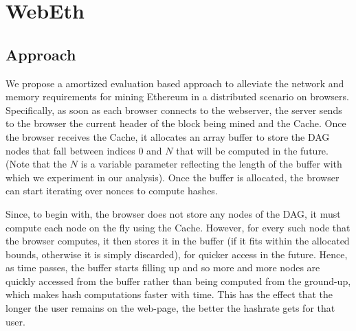 \documentclass[runningheads]{llncs}
\newcommand{\trishita}[1]{}%
\begin{document}
\section{WebEth}
\label{sec:approach}
\subsection{Approach}
We propose a amortized evaluation based approach to alleviate the network and memory requirements for mining Ethereum in a distributed scenario on browsers. Specifically, as soon as each browser connects to the webserver, the server sends to the browser the current header of the block being mined and the Cache. Once the browser receives the Cache, it allocates an array buffer to store the DAG nodes that fall between indices 0 and $N$ that will be computed in the future. (Note that the $N$ is a variable parameter reflecting the length of the buffer with which we experiment in our analysis). Once the buffer is allocated, the browser can start iterating over nonces to compute hashes.  

Since, to begin with, the browser does not store any nodes of the DAG, it must compute each node on the fly using the Cache. However, for every such node that the browser computes, it then stores it in the buffer (if it fits within the allocated bounds, otherwise it is simply discarded), for quicker access in the future. Hence, as time passes, the buffer starts filling up and so more and more nodes are quickly accessed from the buffer rather than being computed from the ground-up, which makes hash computations faster with time. This has the effect that the longer the user remains on the web-page, the better the hashrate gets for that user. 


\end{document}
